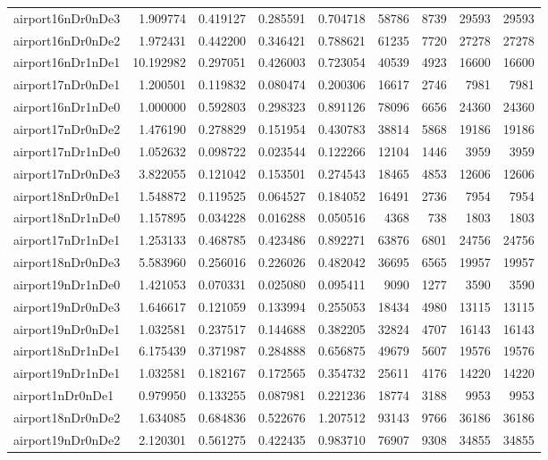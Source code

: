 \begin{longtable}{|l|r|r|r|r|r|r|r|r|}
airport16nDr0nDe3 & 1.909774 & 0.419127 & 0.285591 & 0.704718 & 58786 & 8739 & 29593 & 29593 \\
airport16nDr0nDe2 & 1.972431 & 0.442200 & 0.346421 & 0.788621 & 61235 & 7720 & 27278 & 27278 \\
airport16nDr1nDe1 & 10.192982 & 0.297051 & 0.426003 & 0.723054 & 40539 & 4923 & 16600 & 16600 \\
airport17nDr0nDe1 & 1.200501 & 0.119832 & 0.080474 & 0.200306 & 16617 & 2746 & 7981 & 7981 \\
airport16nDr1nDe0 & 1.000000 & 0.592803 & 0.298323 & 0.891126 & 78096 & 6656 & 24360 & 24360 \\
airport17nDr0nDe2 & 1.476190 & 0.278829 & 0.151954 & 0.430783 & 38814 & 5868 & 19186 & 19186 \\
airport17nDr1nDe0 & 1.052632 & 0.098722 & 0.023544 & 0.122266 & 12104 & 1446 & 3959 & 3959 \\
airport17nDr0nDe3 & 3.822055 & 0.121042 & 0.153501 & 0.274543 & 18465 & 4853 & 12606 & 12606 \\
airport18nDr0nDe1 & 1.548872 & 0.119525 & 0.064527 & 0.184052 & 16491 & 2736 & 7954 & 7954 \\
airport18nDr1nDe0 & 1.157895 & 0.034228 & 0.016288 & 0.050516 & 4368 & 738 & 1803 & 1803 \\
airport17nDr1nDe1 & 1.253133 & 0.468785 & 0.423486 & 0.892271 & 63876 & 6801 & 24756 & 24756 \\
airport18nDr0nDe3 & 5.583960 & 0.256016 & 0.226026 & 0.482042 & 36695 & 6565 & 19957 & 19957 \\
airport19nDr1nDe0 & 1.421053 & 0.070331 & 0.025080 & 0.095411 & 9090 & 1277 & 3590 & 3590 \\
airport19nDr0nDe3 & 1.646617 & 0.121059 & 0.133994 & 0.255053 & 18434 & 4980 & 13115 & 13115 \\
airport19nDr0nDe1 & 1.032581 & 0.237517 & 0.144688 & 0.382205 & 32824 & 4707 & 16143 & 16143 \\
airport18nDr1nDe1 & 6.175439 & 0.371987 & 0.284888 & 0.656875 & 49679 & 5607 & 19576 & 19576 \\
airport19nDr1nDe1 & 1.032581 & 0.182167 & 0.172565 & 0.354732 & 25611 & 4176 & 14220 & 14220 \\
airport1nDr0nDe1 & 0.979950 & 0.133255 & 0.087981 & 0.221236 & 18774 & 3188 & 9953 & 9953 \\
airport18nDr0nDe2 & 1.634085 & 0.684836 & 0.522676 & 1.207512 & 93143 & 9766 & 36186 & 36186 \\
airport19nDr0nDe2 & 2.120301 & 0.561275 & 0.422435 & 0.983710 & 76907 & 9308 & 34855 & 34855 \\

\end{longtable}
